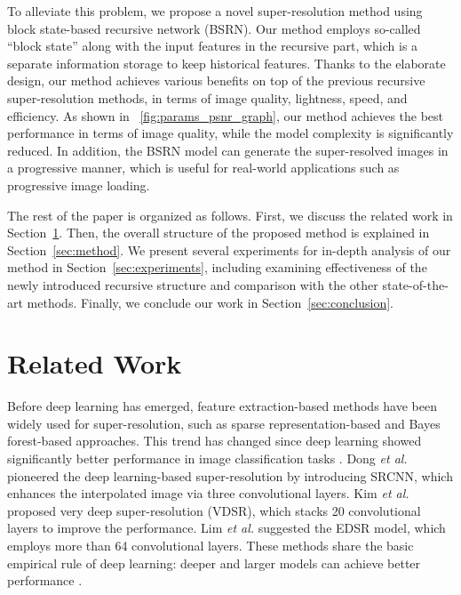 \documentclass[runningheads]{llncs}
\begin{document}
To alleviate this problem, we propose a novel super-resolution method using block state-based recursive network (BSRN).
Our method employs so-called ``block state'' along with the input features in the recursive part, which is a separate information storage to keep historical features.
Thanks to the elaborate design, our method achieves various benefits on top of the previous recursive super-resolution methods, in terms of image quality, lightness, speed, and efficiency.
As shown in \figurename~\ref{fig:params_psnr_graph}, our method achieves the best performance in terms of image quality, while the model complexity is significantly reduced.
In addition, the BSRN model can generate the super-resolved images in a progressive manner, which is useful for real-world applications such as progressive image loading.

The rest of the paper is organized as follows.
First, we discuss the related work in Section~\ref{sec:related_work}.
Then, the overall structure of the proposed method is explained in Section~\ref{sec:method}.
We present several experiments for in-depth analysis of our method in Section~\ref{sec:experiments}, including examining effectiveness of the newly introduced recursive structure and comparison with the other state-of-the-art methods.
Finally, we conclude our work in Section~\ref{sec:conclusion}.


\section{Related Work}
\label{sec:related_work}

Before deep learning has emerged, feature extraction-based methods have been widely used for super-resolution, such as sparse representation-based \cite{yang2011multitask} and Bayes forest-based \cite{salvador2015naive} approaches.
This trend has changed since deep learning showed significantly better performance in image classification tasks \cite{krizhevsky2012imagenet}.
Dong \textit{et al.} \cite{dong2014learning} pioneered the deep learning-based super-resolution by introducing SRCNN, which enhances the interpolated image via three convolutional layers.
Kim \textit{et al.} \cite{kim2016accurate} proposed very deep super-resolution (VDSR), which stacks 20 convolutional layers to improve the performance.
Lim \textit{et al.} \cite{lim2017enhanced} suggested the EDSR model, which employs more than 64 convolutional layers.
These methods share the basic empirical rule of deep learning: deeper and larger models can achieve better performance \cite{montufar2014number}.
\end{document}
